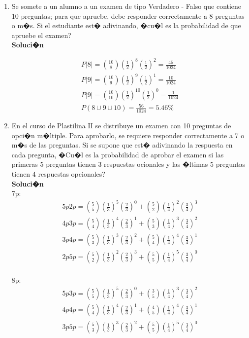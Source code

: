 \documentclass{article}
\begin{document}
\begin{enumerate}
	\item Se somete a un alumno a un examen de tipo Verdadero - Falso que contiene 10 preguntas; para que apruebe, debe responder correctamente a 8 preguntas o m�s. Si el estudiante est� adivinando,  �cu�l es la probabilidad de que apruebe el examen?
    \\\textbf{Soluci�n}
    
    \begin{gather*}
        P|8| = \binom{10}{8}(\frac{1}{2})^8(\frac{1}{2})^2 = \frac{45}{1024}\\
        P|9| = \binom{10}{9}(\frac{1}{2})^9(\frac{1}{2})^1 = \frac{10}{1024}\\
        P|9| = \binom{10}{10}(\frac{1}{2})^{10}(\frac{1}{2})^0 = \frac{1}{1024}\\
        P(8 \cup 9 \cup 10) = \frac{56}{1024} = 5.46\% 
    \end{gather*}
    
    \item En el curso de Plastilina II se distribuye un examen con 10 preguntas de opci�n m�ltiple. Para aprobarlo, se requiere responder correctamente a 7 o m�s de las preguntas. Si se supone que est� adivinando la respuesta en cada pregunta, �Cu�l es la probabilidad de aprobar el examen si las primeras 5 preguntas tienen 3 respuestas ocionales y las �ltimas 5 preguntas tienen 4 respuestas opcionales?
    \\\textbf{Soluci�n}\\
    7p:
    \begin{gather*}
         5p 2p = \binom{5}{5}(\frac{1}{3})^{5}(\frac{2}{3})^0 + \binom{5}{2}(\frac{1}{4})^{2}(\frac{3}{4})^3\\
         4p 3p = \binom{5}{4}(\frac{1}{3})^{4}(\frac{2}{3})^1 + \binom{5}{3}(\frac{1}{4})^{3}(\frac{3}{4})^2\\
         3p 4p = \binom{5}{3}(\frac{1}{3})^{3}(\frac{2}{3})^2 + \binom{5}{4}(\frac{1}{4})^{4}(\frac{3}{4})^1\\
         2p 5p = \binom{5}{2}(\frac{1}{3})^{2}(\frac{2}{3})^3 + \binom{5}{5}(\frac{1}{4})^{5}(\frac{3}{4})^0\\
    \end{gather*}
    
    8p:
    \begin{gather*}
         5p 3p = \binom{5}{5}(\frac{1}{3})^{5}(\frac{2}{3})^0 + \binom{3}{5}(\frac{1}{4})^{3}(\frac{3}{4})^2\\
         4p 4p = \binom{5}{4}(\frac{1}{3})^{4}(\frac{2}{3})^1 + \binom{4}{5}(\frac{1}{4})^{4}(\frac{3}{4})^1\\
         3p 5p = \binom{5}{3}(\frac{1}{3})^{3}(\frac{2}{3})^2 + \binom{5}{5}(\frac{1}{4})^{5}(\frac{3}{4})^0\\
    \end{gather*}
    

\end{enumerate}
\end{document}
